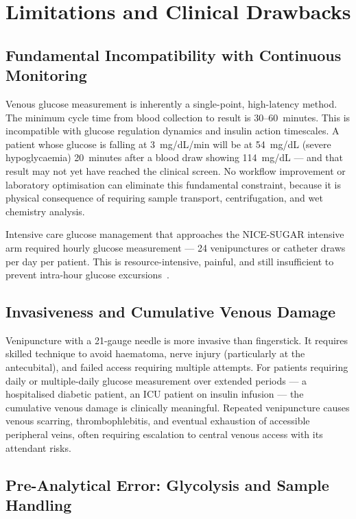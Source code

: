 \section{Limitations and Clinical Drawbacks}

\subsection*{Fundamental Incompatibility with Continuous Monitoring}

Venous glucose measurement is inherently a single-point, high-latency method. The minimum cycle time from blood collection to result is 30--60~minutes. This is incompatible with glucose regulation dynamics and insulin action timescales. A patient whose glucose is falling at 3~mg/dL/min will be at 54~mg/dL (severe hypoglycaemia) 20~minutes after a blood draw showing 114~mg/dL --- and that result may not yet have reached the clinical screen. No workflow improvement or laboratory optimisation can eliminate this fundamental constraint, because it is physical consequence of requiring sample transport, centrifugation, and wet chemistry analysis.

Intensive care glucose management that approaches the NICE-SUGAR intensive arm required hourly glucose measurement --- 24 venipunctures or catheter draws per day per patient. This is resource-intensive, painful, and still insufficient to prevent intra-hour glucose excursions~\cite{nicesugar2009}.

\subsection*{Invasiveness and Cumulative Venous Damage}

Venipuncture with a 21-gauge needle is  more invasive than fingerstick. It requires skilled technique to avoid haematoma, nerve injury (particularly at the antecubital), and failed access requiring multiple attempts. For patients requiring daily or multiple-daily glucose measurement over extended periods --- a hospitalised diabetic patient, an ICU patient on insulin infusion --- the cumulative venous damage is clinically meaningful. Repeated venipuncture causes venous scarring, thrombophlebitis, and eventual exhaustion of accessible peripheral veins, often requiring escalation to central venous access with its attendant risks.

\subsection*{Pre-Analytical Error: Glycolysis and Sample Handling}

